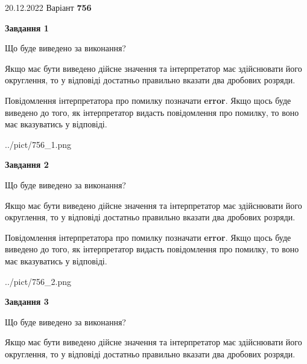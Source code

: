 \documentclass[12pt, ukrainian]{article}
\begin{document}
{20.12.2022 Варіант \No \textbf { 756 }\par}
{
\begin {Large}

{\begin {center}\textbf{Завдання 1}\end {center}}\par
Що буде виведено за виконання? \par

Якщо має бути виведено дійсне значення та інтерпретатор має здійснювати його округлення, 
то у відповіді достатньо правильно вказати два дробових розряди.

Повідомлення інтерпретатора про помилку позначати \textbf{error}.
Якщо щось буде виведено до того, як інтерпретатор видасть повідомлення про помилку, 
то воно має вказуватись у відповіді. \par

\begin{center}
	{../pict/756_1.png}
\end{center}
\newpage

{\begin {center}\textbf{Завдання 2}\end {center}}\par
Що буде виведено за виконання? \par

Якщо має бути виведено дійсне значення та інтерпретатор має здійснювати його округлення, 
то у відповіді достатньо правильно вказати два дробових розряди.

Повідомлення інтерпретатора про помилку позначати \textbf{error}.
Якщо щось буде виведено до того, як інтерпретатор видасть повідомлення про помилку, 
то воно має вказуватись у відповіді. \par

\begin{center}
	{../pict/756_2.png}
\end{center}
\newpage

{\begin {center}\textbf{Завдання 3}\end {center}}\par
Що буде виведено за виконання? \par

Якщо має бути виведено дійсне значення та інтерпретатор має здійснювати його округлення, 
то у відповіді достатньо правильно вказати два дробових розряди.


\end{Large}}
\end{document}
